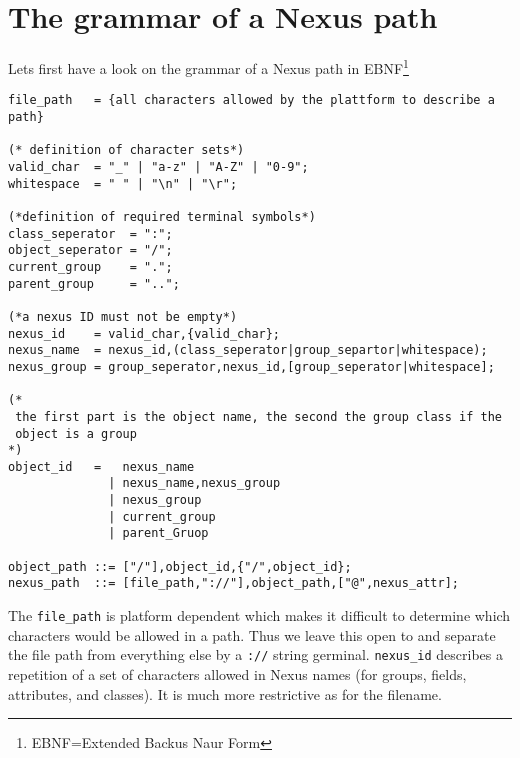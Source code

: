 \section{The grammar of a Nexus path}
Lets first have a look on the grammar of a Nexus path in
EBNF\footnote{EBNF=Extended Backus Naur Form}
\begin{verbatim}
file_path   = {all characters allowed by the plattform to describe a path}

(* definition of character sets*)
valid_char  = "_" | "a-z" | "A-Z" | "0-9";
whitespace  = " " | "\n" | "\r";

(*definition of required terminal symbols*)
class_seperator  = ":";
object_seperator = "/";
current_group    = ".";
parent_group     = "..";

(*a nexus ID must not be empty*)
nexus_id    = valid_char,{valid_char}; 
nexus_name  = nexus_id,(class_seperator|group_separtor|whitespace);
nexus_group = group_seperator,nexus_id,[group_seperator|whitespace];

(*
 the first part is the object name, the second the group class if the 
 object is a group
*)
object_id   =   nexus_name    
              | nexus_name,nexus_group 
              | nexus_group   
              | current_group 
              | parent_Gruop  
                                             
object_path ::= ["/"],object_id,{"/",object_id};
nexus_path  ::= [file_path,"://"],object_path,["@",nexus_attr];
\end{verbatim}

The {\tt file\_path} is platform dependent which makes it difficult to determine
which characters would be allowed in a path. Thus we leave this open to and
separate the file path from everything else by a {\tt ://} string germinal.
{\tt nexus\_id} describes a repetition of a set of characters allowed in Nexus
names (for groups, fields, attributes, and classes). It is much more restrictive
as for the filename.
